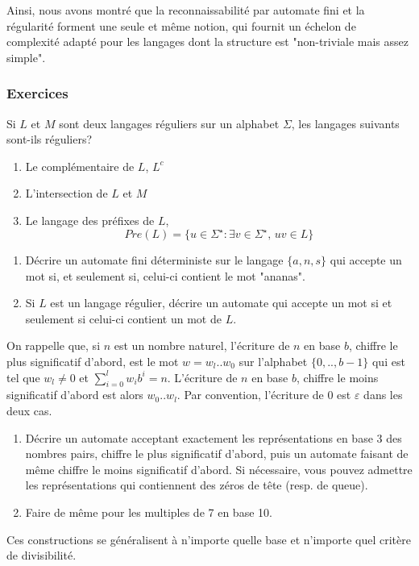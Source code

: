 Ainsi, nous avons montré que la reconnaissabilité par automate fini et la régularité forment une seule et même notion, qui fournit un échelon de complexité adapté pour les langages dont la structure est "non-triviale mais assez simple".

\subsubsection{Exercices}

\begin{exo}
Si $L$ et $M$ sont deux langages réguliers sur un alphabet $\Sigma$, les langages suivants sont-ils réguliers?
\begin{enumerate}
\item Le complémentaire de $L$, $L^c$
\item L'intersection de $L$ et $M$
\item Le langage des préfixes de $L$,
\[Pre(L)=\{u\in\Sigma^\star : \exists v\in\Sigma^\star ,\, uv\in L\}\]
\end{enumerate}
\end{exo}

\begin{exo}
\begin{enumerate}
\item Décrire un automate fini déterministe sur le langage $\{a,n,s\}$ qui accepte un mot si, et seulement si, celui-ci contient le mot "ananas".
\item Si $L$ est un langage régulier, décrire un automate qui accepte un mot si et seulement si celui-ci contient un mot de $L$.
\end{enumerate}
\end{exo}

\begin{exo}
On rappelle que, si $n$ est un nombre naturel, l'écriture de $n$ en base $b$, chiffre le plus significatif d'abord, est le mot $w=w_l..w_0$ sur l'alphabet $\{0,..,b-1\}$ qui est tel que $w_l\neq 0$ et $\sum_{i=0}^l w_ib^i=n$. L'écriture de $n$ en base $b$, chiffre le moins significatif d'abord est alors $w_0..w_l$. Par convention, l'écriture de 0 est $\varepsilon$ dans les deux cas.

\begin{enumerate}
\item Décrire un automate acceptant exactement les représentations en base 3 des nombres pairs, chiffre le plus significatif d'abord, puis un automate faisant de même chiffre le moins significatif d'abord. Si nécessaire, vous pouvez admettre les représentations qui contiennent des zéros de tête (resp. de queue).
\item Faire de même pour les multiples de 7 en base 10.
\end{enumerate}

Ces constructions se généralisent à n'importe quelle base et n'importe quel critère de divisibilité.
\end{exo}

